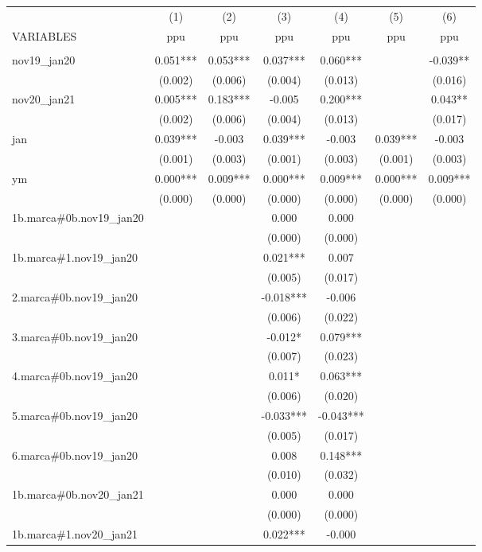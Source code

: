 \begin{tabular}{lcccccc} \hline
 & (1) & (2) & (3) & (4) & (5) & (6) \\
VARIABLES & ppu & ppu & ppu & ppu & ppu & ppu \\ \hline
 &  &  &  &  &  &  \\
nov19\_jan20 & 0.051*** & 0.053*** & 0.037*** & 0.060*** &  & -0.039** \\
 & (0.002) & (0.006) & (0.004) & (0.013) &  & (0.016) \\
nov20\_jan21 & 0.005*** & 0.183*** & -0.005 & 0.200*** &  & 0.043** \\
 & (0.002) & (0.006) & (0.004) & (0.013) &  & (0.017) \\
jan & 0.039*** & -0.003 & 0.039*** & -0.003 & 0.039*** & -0.003 \\
 & (0.001) & (0.003) & (0.001) & (0.003) & (0.001) & (0.003) \\
ym & 0.000*** & 0.009*** & 0.000*** & 0.009*** & 0.000*** & 0.009*** \\
 & (0.000) & (0.000) & (0.000) & (0.000) & (0.000) & (0.000) \\
1b.marca\#0b.nov19\_jan20 &  &  & 0.000 & 0.000 &  &  \\
 &  &  & (0.000) & (0.000) &  &  \\
1b.marca\#1.nov19\_jan20 &  &  & 0.021*** & 0.007 &  &  \\
 &  &  & (0.005) & (0.017) &  &  \\
2.marca\#0b.nov19\_jan20 &  &  & -0.018*** & -0.006 &  &  \\
 &  &  & (0.006) & (0.022) &  &  \\
3.marca\#0b.nov19\_jan20 &  &  & -0.012* & 0.079*** &  &  \\
 &  &  & (0.007) & (0.023) &  &  \\
4.marca\#0b.nov19\_jan20 &  &  & 0.011* & 0.063*** &  &  \\
 &  &  & (0.006) & (0.020) &  &  \\
5.marca\#0b.nov19\_jan20 &  &  & -0.033*** & -0.043*** &  &  \\
 &  &  & (0.005) & (0.017) &  &  \\
6.marca\#0b.nov19\_jan20 &  &  & 0.008 & 0.148*** &  &  \\
 &  &  & (0.010) & (0.032) &  &  \\
1b.marca\#0b.nov20\_jan21 &  &  & 0.000 & 0.000 &  &  \\
 &  &  & (0.000) & (0.000) &  &  \\
1b.marca\#1.nov20\_jan21 &  &  & 0.022*** & -0.000 &  &  \\

\end{tabular}
